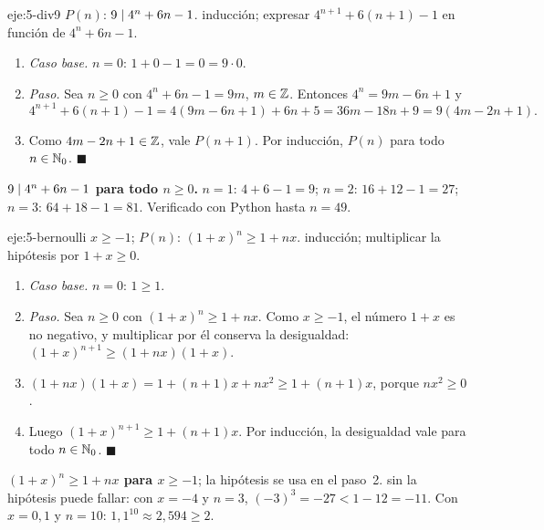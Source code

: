 \begin{solucion}{eje:5-div9}
\datos $P(n)$: $9\mid 4^{n}+6n-1$.
\planteamiento inducción; expresar $4^{n+1}+6(n+1)-1$ en función de $4^{n}+6n-1$.
\pasos
\begin{enumerate}[label=\arabic*.]
  \item \emph{Caso base.} $n=0$: $1+0-1=0=9\cdot 0$.
  \item \emph{Paso.} Sea $n\ge 0$ con $4^{n}+6n-1=9m$, $m\in\mathbb{Z}$. Entonces $4^{n}=9m-6n+1$ y
  \[
  4^{n+1}+6(n+1)-1=4(9m-6n+1)+6n+5=36m-18n+9=9(4m-2n+1).
  \]
  \item Como $4m-2n+1\in\mathbb{Z}$, vale $P(n+1)$. Por inducción, $P(n)$ para todo $n\in\mathbb{N}_0$. $\blacksquare$
\end{enumerate}
\resultado \textbf{$9\mid 4^{n}+6n-1$ para todo $n\ge 0$.}
\comprobacion $n=1$: $4+6-1=9$; $n=2$: $16+12-1=27$; $n=3$: $64+18-1=81$. Verificado con Python hasta $n=49$.
\end{solucion}

\begin{solucion}{eje:5-bernoulli}
\datos $x\ge -1$; $P(n)$: $(1+x)^{n}\ge 1+nx$.
\planteamiento inducción; multiplicar la hipótesis por $1+x\ge 0$.
\pasos
\begin{enumerate}[label=\arabic*.]
  \item \emph{Caso base.} $n=0$: $1\ge 1$.
  \item \emph{Paso.} Sea $n\ge 0$ con $(1+x)^{n}\ge 1+nx$. Como $x\ge -1$, el número $1+x$ es no negativo, y multiplicar por él conserva la desigualdad: $(1+x)^{n+1}\ge(1+nx)(1+x)$.
  \item $(1+nx)(1+x)=1+(n+1)x+nx^{2}\ge 1+(n+1)x$, porque $nx^{2}\ge 0$.
  \item Luego $(1+x)^{n+1}\ge 1+(n+1)x$. Por inducción, la desigualdad vale para todo $n\in\mathbb{N}_0$. $\blacksquare$
\end{enumerate}
\resultado \textbf{$(1+x)^{n}\ge 1+nx$ para $x\ge -1$}; la hipótesis se usa en el paso~2.
\comprobacion sin la hipótesis puede fallar: con $x=-4$ y $n=3$, $(-3)^{3}=-27<1-12=-11$. Con $x=0{,}1$ y $n=10$: $1{,}1^{10}\approx 2{,}594\ge 2$.
\end{solucion}


